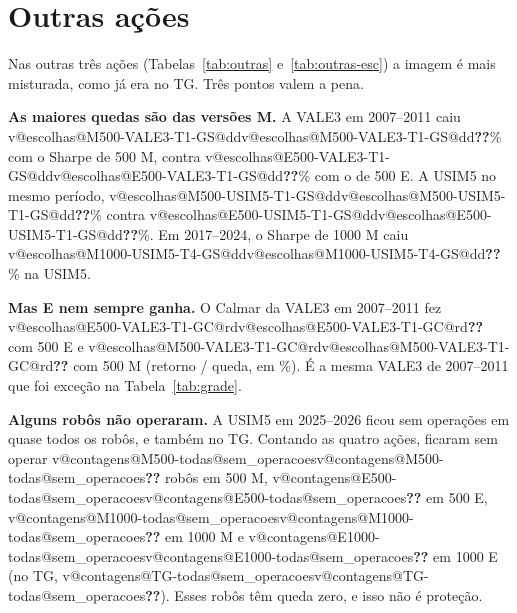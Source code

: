 \documentclass[11pt,a4paper]{article}
\makeatletter
\newcommand{\V}[3]{\ifcsname v@#1@#2@#3\endcsname\csname v@#1@#2@#3\endcsname\else\textbf{\color{red}??}\fi}
\makeatother
\begin{document}
\section{Outras ações}
\label{sec:outras}

Nas outras três ações (Tabelas~\ref{tab:outras} e~\ref{tab:outras-esc}) a imagem é mais misturada, como já era
no TG. Três pontos valem a pena.

\textbf{As maiores quedas são das versões M.} A VALE3 em 2007--2011 caiu \V{escolhas}{M500-VALE3-T1-GS}{dd}\%
com o Sharpe de 500 M, contra \V{escolhas}{E500-VALE3-T1-GS}{dd}\% com o de 500 E. A USIM5 no mesmo período,
\V{escolhas}{M500-USIM5-T1-GS}{dd}\% contra \V{escolhas}{E500-USIM5-T1-GS}{dd}\%. Em 2017--2024, o Sharpe de
1000 M caiu \V{escolhas}{M1000-USIM5-T4-GS}{dd}\% na USIM5.

\textbf{Mas E nem sempre ganha.} O Calmar da VALE3 em 2007--2011 fez \V{escolhas}{E500-VALE3-T1-GC}{rd} com 500 E
e \V{escolhas}{M500-VALE3-T1-GC}{rd} com 500 M (retorno / queda, em \%). É a mesma VALE3 de 2007--2011 que foi
exceção na Tabela~\ref{tab:grade}.

\textbf{Alguns robôs não operaram.} A USIM5 em 2025--2026 ficou sem operações em quase todos os robôs, e
também no TG. Contando as quatro ações, ficaram sem operar \V{contagens}{M500-todas}{sem_operacoes} robôs em 500
M, \V{contagens}{E500-todas}{sem_operacoes} em 500 E, \V{contagens}{M1000-todas}{sem_operacoes} em 1000 M e
\V{contagens}{E1000-todas}{sem_operacoes} em 1000 E (no TG, \V{contagens}{TG-todas}{sem_operacoes}). Esses
robôs têm queda zero, e isso não é proteção.
\end{document}
